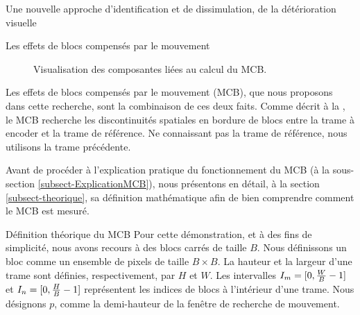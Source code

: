 \begin{chapter}{Une nouvelle approche d'identification et de dissimulation, de
la détérioration visuelle}
\begin{section}{Les effets de blocs compensés par le mouvement}
\begin{figure}
	\caption[Visualisation des composantes liées au calcul du MCB]{Visualisation
des composantes liées au calcul du MCB.}
	\label{fig-MCB}
\end{figure}

Les effets de blocs compensés par le mouvement (MCB), que nous proposons dans
cette recherche, sont la combinaison de ces deux faits. Comme décrit à la
, le MCB recherche les discontinuités spatiales en bordure de blocs
entre la trame à encoder et la trame de référence. Ne connaissant pas la trame
de référence, nous utilisons la trame précédente.

Avant de procéder à l'explication pratique du fonctionnement du MCB (à la
sous-section \ref{subsect-ExplicationMCB}), nous présentons en détail, à la
section \ref{subsect-theorique}, sa définition mathématique afin de bien
comprendre comment le MCB est mesuré.

\FloatBarrier
\begin{subsection}{Définition théorique du MCB}
\label{subsect-theorique}
Pour cette démonstration, et à des fins de simplicité, nous avons recours à des
blocs carrés de taille $B$. Nous définissons un bloc comme un ensemble de
pixels de taille $B\times B$. La hauteur et la largeur d'une trame sont
définies, respectivement, par $H$ et $W$. Les intervalles
$I_{m}=[0,\frac{W}{B}-1]$ et $I_{n}=[0,\frac{H}{B}-1]$ représentent les
indices de blocs à l'intérieur d'une trame. Nous désignons $p$, comme la
demi-hauteur de la fenêtre de recherche de mouvement.


\end{subsection}
\end{section}
\end{chapter}
